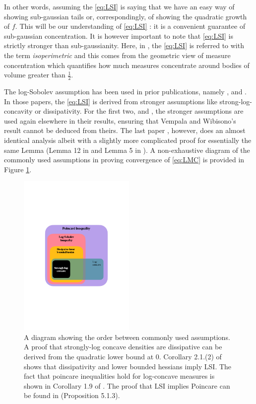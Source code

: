 \documentclass[11pt,twoside]{article}
\theoremstyle{definition}
\begin{document}
In other words, assuming the \eqref{eq:LSI} is saying that we have an easy way of showing sub-gaussian tails or, correspondingly, of showing the quadratic growth of $f$. This will be our understanding of \eqref{eq:LSI} : it is a convenient guarantee of sub-gaussian concentration. It is however important to note that \eqref{eq:LSI} is strictly stronger than sub-gaussianity. Here, in \cite{vempala_rapid_2019}, the \eqref{eq:LSI} is referred to with the term \textit{isoperimetric} and this comes from the geometric view of measure concentration which quantifies how much measures concentrate around bodies of volume greater than $\frac{1}{2}$.

The log-Sobolev assumption has been used in prior publications, namely \cite{dalalyan_theoretical_2014},  \cite{raginsky_non-convex_2017} and \cite{ma_sampling_2019}. In those papers, the \eqref{eq:LSI} is derived from stronger assumptions like strong-log-concavity or dissipativity. For the first two, \cite{dalalyan_theoretical_2014} and \cite{raginsky_non-convex_2017}, the stronger assumptions are used again elsewhere in their results, ensuring that Vempala and Wibisono's result cannot be deduced from theirs. The last paper \cite{ma_sampling_2019}, however, does an almost identical analysis albeit with a slightly more complicated proof for essentially the same Lemma (Lemma 12 in \cite{vempala_rapid_2019} and Lemma 5 in \cite{ma_sampling_2019}). A non-exhaustive diagram of the commonly used assumptions in proving convergence of \eqref{eq:LMC} is provided in Figure \ref{fig:diagram}.
\begin{figure}
    \centering
    \includegraphics[width=0.5\textwidth]{diagram.pdf}
    \caption{A diagram showing the order between commonly used assumptions.  A proof that strongly-log concave densities are dissipative can be derived from the quadratic lower bound at $0$. Corollary 2.1.(2) of \cite{cattiaux_note_2010} shows that dissipativity and lower bounded hessians imply LSI. The fact that poincare inequalities  hold for log-concave measures is shown in Corollary 1.9 of \cite{bakry_simple_2008}. The proof that LSI implies Poincare can be found in \cite{bakry_markov_2014}(Proposition 5.1.3).}
    \label{fig:diagram}
\end{figure}
\end{document}
